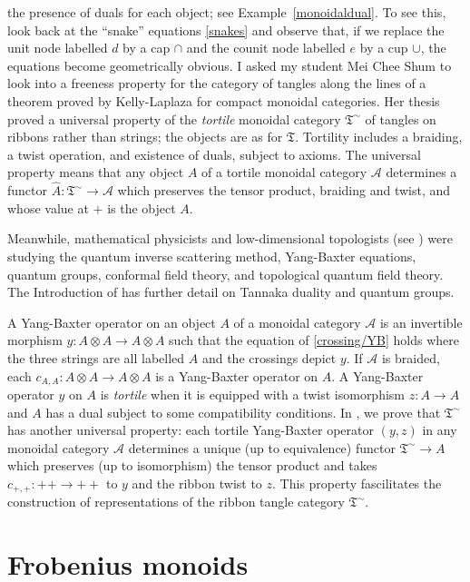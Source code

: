 \documentclass[a4paper,12pt]{article}
\theoremstyle{step}
\def\CA{{\mathscr A}}
\def\ot{{\otimes}}
\begin{document}
the presence of duals for each object; see Example~\ref{monoidaldual}. To see this, look back at the ``snake'' equations \eqref{snakes} and observe that, if we replace the unit node labelled $d$ by a cap $\cap$ and the counit node labelled $e$ by a cup $\cup$, the equations
become geometrically obvious. I asked my student Mei Chee Shum to look into a freeness
property for the category of tangles along the lines of a theorem proved by Kelly-Laplaza
for compact monoidal categories. Her thesis \cite{Shu} proved a universal property of the 
{\em tortile} monoidal category $\mathfrak{T^{\sim}}$ of tangles on ribbons rather than strings;
the objects are as for $\mathfrak{T}$.
Tortility \cite{BTC} includes a braiding, a twist operation, and existence of duals, subject to axioms. 
The universal property means that any object $A$ of a tortile monoidal category $\CA$ determines a
functor $\hat{A} : \mathfrak{T^{\sim}}\to \CA$ which preserves the tensor product, braiding and twist,
and whose value at $+$ is the object $A$. 
  
Meanwhile, mathematical physicists and low-dimensional topologists (see \cite{Dri1985, FRT, Turaev1988, Seg, Wit}) were studying the quantum inverse scattering method, Yang-Baxter equations, 
quantum groups, conformal field theory, and topological quantum field theory. 
The Introduction of \cite{40} has further detail on Tannaka duality and quantum groups.

A Yang-Baxter operator on an object $A$ of a monoidal category $\CA$ 
is an invertible morphism $y : A\ot A \to A\ot A$ such that the equation of \eqref{crossing/YB} holds
where the three strings are all labelled $A$ and the crossings depict $y$. 
If $\CA$ is braided, each $c_{A,A} : A\ot A\to A\ot A$ is a Yang-Baxter operator on $A$.
A Yang-Baxter operator $y$ on $A$ is {\em tortile} when it is equipped with a twist isomorphism $z : A \to A$
and $A$ has a dual subject to some compatibility conditions.
 In \cite{TYBO}, we prove that $\mathfrak{T^{\sim}}$ has another universal property: each tortile Yang-Baxter operator $(y,z)$ in any monoidal category $\CA$ determines a unique (up to equivalence) functor $\mathfrak{T^{\sim}}\to A$ which preserves (up to isomorphism) the tensor product and takes $c_{+,+} : ++\to ++$ to $y$ and the ribbon twist to $z$. This property fascilitates the construction of representations of the ribbon tangle category $\mathfrak{T^{\sim}}$.

\section{Frobenius monoids}\label{Frobenius}
\end{document}

